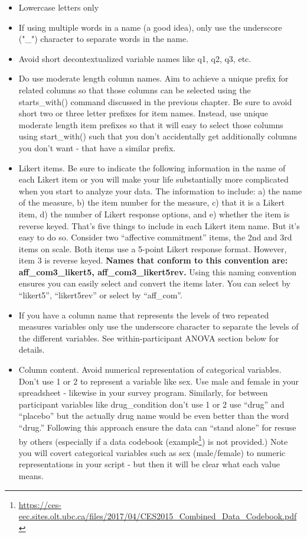 \documentclass[
]{krantz}
\renewcommand{\href}[2]{#2\footnote{\url{#1}}}
\begin{document}
\begin{itemize}
\item
  Lowercase letters only
\item
  If using multiple words in a name (a good idea), only use the underscore ("\_") character to separate words in the name.
\item
  Avoid short decontextualized variable names like q1, q2, q3, etc.
\item
  Do use moderate length column names. Aim to achieve a unique prefix for related columns so that those columns can be selected using the starts\_with() command discussed in the previous chapter. Be sure to avoid short two or three letter prefixes for item names. Instead, use unique moderate length item prefixes so that it will easy to select those columns using start\_with() such that you don't accidentally get additionally columns you don't want - that have a similar prefix.
\item
  Likert items. Be sure to indicate the following information in the name of each Likert item or you will make your life substantially more complicated when you start to analyze your data. The information to include: a) the name of the measure, b) the item number for the measure, c) that it is a Likert item, d) the number of Likert response options, and e) whether the item is reverse keyed. That's five things to include in each Likert item name. But it's easy to do so. Consider two ``affective commitment'' items, the 2nd and 3rd items on scale. Both items use a 5-point Likert response format. However, item 3 is reverse keyed. \textbf{Names that conform to this convention are: aff\_com3\_likert5, aff\_com3\_likert5rev.} Using this naming convention ensures you can easily select and convert the items later. You can select by ``likert5'', ``likert5rev'' or select by ``aff\_com''.
\item
  If you have a column name that represents the levels of two repeated measures variables only use the underscore character to separate the levels of the different variables. See within-participant ANOVA section below for details.
\item
  Column content. Avoid numerical representation of categorical variables. Don't use 1 or 2 to represent a variable like sex. Use male and female in your spreadsheet - likewise in your survey program. Similarly, for between participant variables like drug\_condition don't use 1 or 2 use ``drug'' and ``placebo'' but the actually drug name would be even better than the word ``drug.'' Following this approach ensure the data can ``stand alone'' for resuse by others (especially if a data codebook (\href{https://ces-eec.sites.olt.ubc.ca/files/2017/04/CES2015_Combined_Data_Codebook.pdf}{example}) is not provided.) Note you will covert categorical variables such as sex (male/female) to numeric representations in your script - but then it will be clear what each value means.
\end{itemize}
\end{document}
